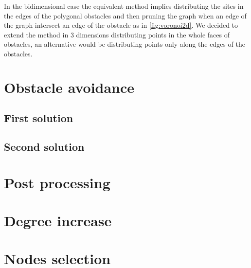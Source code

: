 \documentclass[dissertation.tex]{subfiles}
\begin{document}
In the bidimensional case the equivalent method implies distributing
the sites in the edges of the polygonal obstacles and then pruning the
graph when an edge of the graph intersect an edge of the obstacle as
in \cref{fig:voronoi2d}.
We decided to extend the method in 3 dimensions distributing points in
the whole faces of obstacles, an alternative would be distributing
points only along the edges of the obstacles.

\section{Obstacle avoidance}\label{sec:obsAvoid}
\subsection{First solution}
\subsection{Second solution}
\section{Post processing}\label{sec:postPro}
\section{Degree increase}\label{sec:degreeInc}
\section{Nodes selection}\label{sec:nodeSel}
\end{document}
